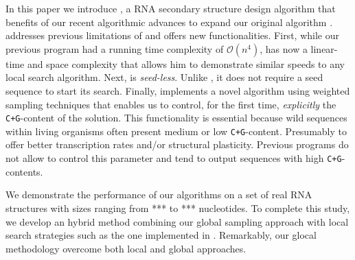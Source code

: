 In this paper we introduce \RNApyro, a RNA secondary structure design algorithm that benefits of our recent algorithmic advances \cite{Reinharz:2013aa} to expand our original \RNAensign algorithm \cite{Levin:2012kx}. \RNApyro addresses previous limitations of \RNAensign and offers new functionalities. First, while our previous program had a running time complexity of $\mathcal{O}(n^4)$, \RNApyro has now a linear-time and space complexity that allows him to demonstrate similar speeds to any local search algorithm. Next, \RNApyro is \textit{seed-less}. Unlike \RNAensign, it does not require a seed sequence to start its search. Finally, \RNApyro implements a novel algorithm using weighted sampling techniques \cite{DBLP:journals/corr/abs-1002-0046} that enables us to control, for the first time, \textit{explicitly} the \texttt{C+G}-content of the solution. This functionality is essential because wild sequences within living organisms often present medium or low \texttt{C+G}-content. Presumably to offer better transcription rates and/or structural plasticity. Previous programs do not allow to control this parameter and tend to output sequences with high \texttt{C+G}-contents. 

We demonstrate the performance of our algorithms on a set of real RNA structures with sizes ranging from *** to *** nucleotides. To complete this study, we develop an hybrid method combining our global sampling approach with local search strategies such as the one implemented in \RNAinverse. Remarkably, our glocal methodology overcome both local and global approaches.